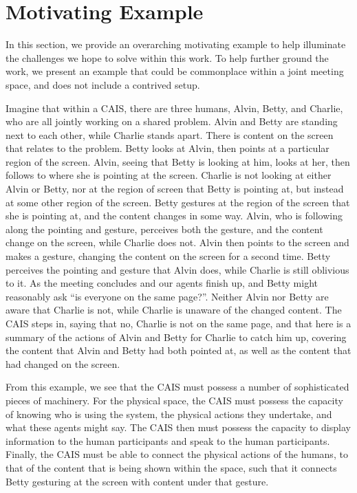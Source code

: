 \section{Motivating Example}

In this section, we provide an overarching motivating example to help
illuminate the challenges we hope to solve within this work. To help further
ground the work, we present an example that could be commonplace within a joint
meeting space, and does not include a contrived setup.

Imagine that within a CAIS, there are three humans, Alvin, Betty, and Charlie,
who are all jointly working on a shared problem. Alvin and Betty are standing
next to each other, while Charlie stands apart. There is content on the screen
that relates to the problem. Betty looks at Alvin, then points at a particular
region of the screen. Alvin, seeing that Betty is looking at him, looks at her,
then follows to where she is pointing at the screen. Charlie is not looking at
either Alvin or Betty, nor at the region of screen that Betty is pointing at,
but instead at some other region of the screen. Betty gestures at the region of
the screen that she is pointing at, and the content changes in some way. Alvin,
who is following along the pointing and gesture, perceives both the gesture, and
the content change on the screen, while Charlie does not. Alvin then points to
the screen and makes a gesture, changing the content on the screen for a second
time. Betty perceives the pointing and gesture that Alvin does, while Charlie is
still oblivious to it. As the meeting concludes and our agents finish up, and Betty
might
reasonably ask ``is everyone on the same page?''. Neither Alvin nor
Betty are aware that Charlie is not, while Charlie is unaware of the
changed content. The CAIS steps in, saying that no, Charlie is not on
the same page, and that here is a summary of the actions of Alvin and
Betty for Charlie to catch him up, covering the content that Alvin and
Betty had both pointed at, as well as the content that had changed on
the screen.

From this example, we see that the CAIS must possess a number of
sophisticated pieces of machinery. For the physical space, the CAIS
must possess the capacity of knowing who is using the system, the
physical actions they undertake, and what these agents might say. The
CAIS then must possess the capacity to display information to the
human participants and speak to the human participants. Finally, the
CAIS must be able to connect the physical actions of the humans, to
that of the content that is being shown within the space, such that it
connects Betty gesturing at the screen with content under that
gesture.

